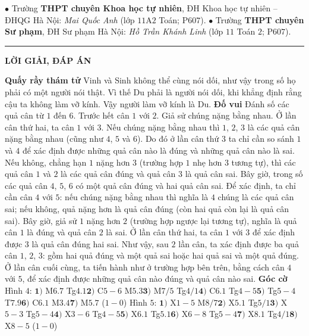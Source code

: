 \begin{multicols}{2}
	\vskip 0.05cm
	$\bullet$ Trường \textbf{\color{thachthuctoanhoc}THPT chuyên Khoa học tự nhiên}, ĐH Khoa học tự nhiên -- ĐHQG Hà Nội: \textit{Mai Quốc Anh} (lớp $11$A$2$ Toán; P$607$).
	\vskip 0.05cm
	$\bullet$ Trường \textbf{\color{thachthuctoanhoc}THPT chuyên Sư phạm}, ĐH Sư phạm Hà Nội: \textit{Hồ Trần Khánh Linh} (lớp $11$ Toán $2$; P$607$).
\end{multicols}
\vspace*{-10pt}
\rule{1\linewidth}{0.1pt}
\begin{center}
	\textbf{\LARGE\color{thachthuctoanhoc}LỜI GIẢI, ĐÁP ÁN}
\end{center}

\begin{multicols}{2}
	\textbf{\color{thachthuctoanhoc}Quấy rầy thám tử}
	\vskip 0.05cm
	Vinh và Sinh không thể cùng nói dối, như vậy trong số họ phải có một người nói thật. Vì thế Du phải là người nói dối, khi khẳng định rằng cậu ta không làm vỡ kính. Vậy người làm vỡ kính là Du.
	\vskip 0.05cm
	\textbf{\color{thachthuctoanhoc}Đố vui}
	\vskip 0.05cm
	Đánh số các quả cân từ $1$ đến $6$. 
	\vskip 0.05cm
	Trước hết cân $1$ với $2$. Giả sử chúng nặng bằng nhau. Ở lần cân thứ hai, ta cân $1$ với $3$. Nếu chúng nặng bằng nhau thì $1$, $2$, $3$ là các quả cân nặng bằng nhau (cũng như $4$, $5$ và $6$). Do đó ở lần cân thứ $3$ ta chỉ cần so sánh $1$ và $4$ để xác định được những quả cân nào là đúng và những quả cân nào là sai. Nếu không, chẳng hạn $1$ nặng hơn $3$ (trường hợp $1$ nhẹ hơn $3$ tương tự), thì các quả cân $1$ và $2$ là các quả cân đúng và quả cân $3$ là quả cân sai. Bây giờ, trong số các quả cân $4$, $5$, $6$ có một quả cân đúng và hai quả cân sai. Để xác định, ta chỉ cần cân $4$ với $5$: nếu chúng nặng bằng nhau thì nghĩa là $4$ chúng là các quả cân sai; nếu không, quả nặng hơn là quả cân đúng (còn hai quả còn lại là quả cân sai). 
	\vskip 0.05cm
	Bây giờ, giả sử $1$ nặng hơn $2$ (trường hợp ngược lại tương tự), nghĩa là quả cân $1$ là đúng và quả cân $2$ là sai. Ở lần cân thứ hai, ta cân $1$ với $3$ để xác định được $3$ là quả cân đúng hai sai. Như vậy, sau $2$ lần cân, ta xác định được ba quả cân $1$, $2$, $3$: gồm hai quả đúng và một quả sai hoặc hai quả sai và một quả đúng. Ở lần cân cuối cùng, ta tiến hành như ở trường hợp bên trên, bằng cách cân $4$ với $5$, để xác định được những quả cân nào đúng và quả cân nào sai.  
	\vskip 0.05cm
	\textbf{\color{thachthuctoanhoc}Góc cờ}
	\vskip 0.05cm
	Hình $4$: $\pmb{1)}$	M$6.7$ Tg$4.1$\quad $\pmb{2)}$ C$5-6$ M$5.3$\quad $\pmb{3)}$ M$7/5$ Tg$4/1$\quad $\pmb{4)}$ C$6.1$ Tg$4-5$\quad $\pmb{5)}$ Tg$5-4$ T$7.9$\quad $\pmb{6)}$ C$6.1$ M$3.4$\quad $\pmb{7)}$ M$5.7$ ($1-0$)
	\vskip 0.05cm
	Hình $5$: $\pmb{1)}$ X$1-5$ M$8/7$\quad $\pmb{2)}$ X$5.1$ Tg$5/1$\quad $\pmb{3)}$ X$5-3$ Tg$5-4$\quad $\pmb{4)}$ X$3-6$ Tg$4-5$\quad $\pmb{5)}$ X$6.1$ Tg$5.1$\quad $\pmb{6)}$ X$6-8$ Tg$5-4$\quad $\pmb{7)}$ X$8.1$ Tg$4/1$\quad $\pmb{8)}$ X$8-5$ ($1-0$)
\end{multicols}